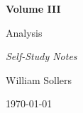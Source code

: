 \begin{titlepage}
\centering

\vspace*{5cm}

{\Huge\bfseries Volume III\par}

\vspace{0.5cm}

{\LARGE Analysis\par}

\vspace{0.5cm}

{\large\itshape Self-Study Notes\par}

\vfill

{\large William Sollers\par}

\vspace{0.5cm}

{\large \today\par}

\end{titlepage}
